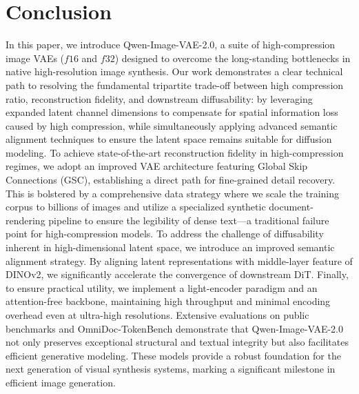 \section{Conclusion}
In this paper, we introduce Qwen-Image-VAE-2.0, a suite of high-compression image VAEs ($f16$ and $f32$) designed to overcome the long-standing bottlenecks in native high-resolution image synthesis. Our work demonstrates a clear technical path to resolving the fundamental tripartite trade-off between high compression ratio, reconstruction fidelity, and downstream diffusability: by leveraging expanded latent channel dimensions to compensate for spatial information loss caused by high compression, while simultaneously applying advanced semantic alignment techniques to ensure the latent space remains suitable for diffusion modeling. To achieve state-of-the-art reconstruction fidelity in high-compression regimes, we adopt an improved VAE architecture featuring Global Skip Connections (GSC), establishing a direct path for fine-grained detail recovery. This is bolstered by a comprehensive data strategy where we scale the training corpus to billions of images and utilize a specialized synthetic document-rendering pipeline to ensure the legibility of dense text—a traditional failure point for high-compression models. To address the challenge of diffusability inherent in high-dimensional latent space, we introduce an improved semantic alignment strategy. By aligning latent representations with middle-layer feature of DINOv2, we significantly accelerate the convergence of downstream DiT. Finally, to ensure practical utility, we implement a light-encoder paradigm and an attention-free backbone, maintaining high throughput and minimal encoding overhead even at ultra-high resolutions. Extensive evaluations on public benchmarks and OmniDoc-TokenBench demonstrate that Qwen-Image-VAE-2.0 not only preserves exceptional structural and textual integrity but also facilitates efficient generative modeling. These models provide a robust foundation for the next generation of visual synthesis systems, marking a significant milestone in efficient image generation.